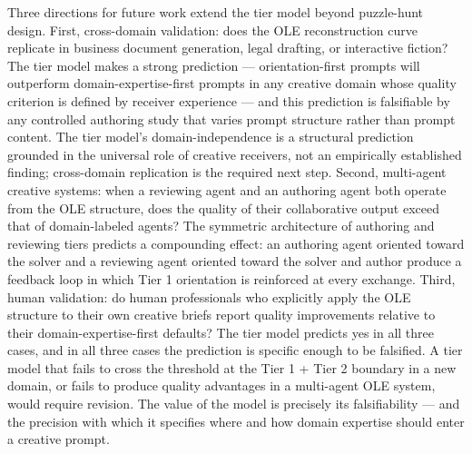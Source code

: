 Three directions for future work extend the tier model beyond puzzle-hunt design. First,
cross-domain validation: does the OLE reconstruction curve replicate in business document
generation, legal drafting, or interactive fiction? The tier model makes a strong
prediction --- orientation-first prompts will outperform domain-expertise-first prompts
in any creative domain whose quality criterion is defined by receiver experience --- and
this prediction is falsifiable by any controlled authoring study that varies prompt
structure rather than prompt content. The tier model's domain-independence is a structural
prediction grounded in the universal role of creative receivers, not an empirically
established finding; cross-domain replication is the required next step.
Second, multi-agent creative systems: when a
reviewing agent and an authoring agent both operate from the OLE structure, does the
quality of their collaborative output exceed that of domain-labeled agents? The symmetric
architecture of authoring and reviewing tiers predicts a compounding effect: an authoring
agent oriented toward the solver and a reviewing agent oriented toward the solver and
author produce a feedback loop in which Tier 1 orientation is reinforced at every
exchange. Third, human validation: do human professionals who explicitly apply the OLE
structure to their own creative briefs report quality improvements relative to their
domain-expertise-first defaults? The tier model predicts yes in all three cases, and in
all three cases the prediction is specific enough to be falsified. A tier model that
fails to cross the threshold at the Tier 1 + Tier 2 boundary in a new domain, or fails
to produce quality advantages in a multi-agent OLE system, would require revision. The
value of the model is precisely its falsifiability --- and the precision with which it
specifies where and how domain expertise should enter a creative prompt.
